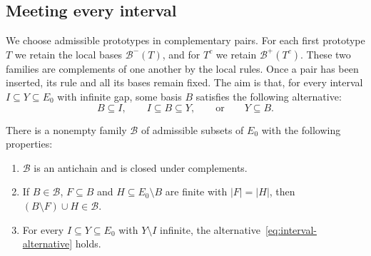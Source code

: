 \subsection{Meeting every interval}

We choose admissible prototypes in complementary pairs.
For each first prototype $T$ we retain the local bases
$\mathcal B^-(T)$, and for $T^c$ we retain $\mathcal B^+(T^c)$.
These two families are complements of one another by the local rules.
Once a pair has been inserted, its rule and all its bases remain fixed.
The aim is that, for every interval $I\subseteq Y\subseteq E_0$ with infinite gap,
some basis $B$ satisfies the following alternative:
\begin{equation}\label{eq:interval-alternative}
 B\subseteq I,\qquad I\subseteq B\subseteq Y,
 \qquad\text{or}\qquad Y\subseteq B.
\end{equation}

\begin{proposition}\label{prop:basis-family}
There is a nonempty family $\mathcal B$ of admissible subsets of $E_0$
with the following properties:
\begin{enumerate}
 \item $\mathcal B$ is an antichain and is closed under complements.
 \item If $B\in\mathcal B$, $F\subseteq B$ and $H\subseteq E_0\setminus B$
 are finite with $|F|=|H|$, then $(B\setminus F)\cup H\in\mathcal B$.
 \item For every $I\subseteq Y\subseteq E_0$ with $Y\setminus I$ infinite,
 the alternative~\eqref{eq:interval-alternative} holds.
\end{enumerate}
\end{proposition}

